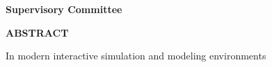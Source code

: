 \newpage
{}

\noindent \textbf{Supervisory Committee}
\tpbreak
\panel

\begin{center}
\textbf{ABSTRACT}
\end{center}

In modern interactive simulation and modeling environments
